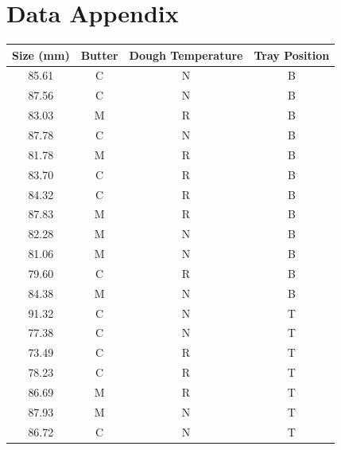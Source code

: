 \documentclass[paper=a4, fontsize=11pt]{scrartcl} %
\numberwithin{equation}{section} %
\numberwithin{figure}{section} %
\numberwithin{table}{section} %
\begin{document}
\newpage
\section*{Data Appendix}
\begin{table}[H]
\centering
\begin{tabular}{|c|c|c|c|}
\hline
\textbf{Size (mm)} & \textbf{Butter} & \textbf{Dough Temperature} & \textbf{Tray Position} \\ \hline
85.61         & C               & N                & B             \\ \hline
87.56         & C               & N                & B             \\ \hline
83.03         & M               & R                & B             \\ \hline
87.78         & C               & N                & B             \\ \hline
81.78         & M               & R                & B             \\ \hline
83.70         & C               & R                & B             \\ \hline
84.32         & C               & R                & B             \\ \hline
87.83         & M               & R                & B             \\ \hline
82.28         & M               & N                & B             \\ \hline
81.06         & M               & N                & B             \\ \hline
79.60         & C               & R                & B             \\ \hline
84.38         & M               & N                & B             \\ \hline
91.32         & C               & N                & T             \\ \hline
77.38         & C               & N                & T             \\ \hline
73.49         & C               & R                & T             \\ \hline
78.23         & C               & R                & T             \\ \hline
86.69         & M               & R                & T             \\ \hline
87.93         & M               & N                & T             \\ \hline
86.72         & C               & N                & T             \\ \hline

\end{tabular}
\end{table}
\end{document}
